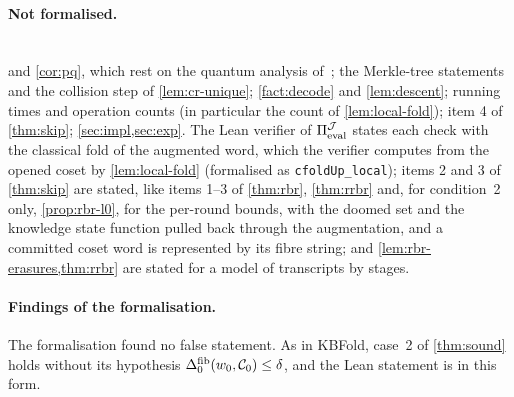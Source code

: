 \paragraph{Not formalised.}\leavevmode\\
 and \cref{cor:pq}, which rest on the quantum analysis of~\cite{CDHZ25}; the Merkle-tree statements and the collision step of \cref{lem:cr-unique}; \cref{fact:decode} and \cref{lem:descent}; running times and operation counts (in particular the count of \cref{lem:local-fold}); item 4 of \cref{thm:skip}; \cref{sec:impl,sec:exp}.
The Lean verifier of $\Pi_{\mathrm{eval}}^{\mathcal{J}}$ states each check with the classical fold of the augmented word, which the verifier computes from the opened coset by \cref{lem:local-fold} (formalised as \texttt{cfoldUp\_local}); items 2 and 3 of \cref{thm:skip} are stated, like items 1--3 of \cref{thm:rbr}, \cref{thm:rrbr} and, for condition~2 only, \cref{prop:rbr-l0}, for the per-round bounds, with the doomed set and the knowledge state function pulled back through the augmentation, and a committed coset word is represented by its fibre string; and \cref{lem:rbr-erasures,thm:rrbr} are stated for a model of transcripts by stages.

\paragraph{Findings of the formalisation.}
The formalisation found no false statement. As in KBFold, case~2 of \cref{thm:sound} holds without its hypothesis $\Delta^{\mathrm{fib}}_0(w_0, \mathcal{C}_0) \le \delta$, and the Lean statement is in this form.
